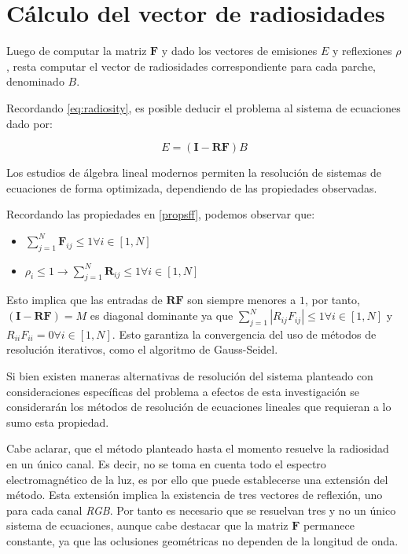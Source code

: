 \section{Cálculo del vector de radiosidades}

Luego de computar la matriz $\mathbf{F}$ y dado los vectores de emisiones $E$ y reflexiones $\rho$, resta computar el vector de radiosidades correspondiente para cada parche, denominado $B$.

Recordando \eqref{eq:radiosity}, es posible deducir el problema al sistema de ecuaciones dado por:

\begin{equation}
	E = (\mathbf{I} - \mathbf{RF})B
\end{equation}

Los estudios de álgebra lineal modernos permiten la resolución de sistemas de ecuaciones de forma optimizada, dependiendo de las propiedades observadas.

Recordando las propiedades en \ref{propsff}, podemos observar que:

\begin{itemize}
	\item $\sum_{j=1}^{N} \mathbf{F}_{ij} \leq 1 \forall{i \in [1,N]}$
	\item $\rho_{i} \leq 1 \rightarrow \sum_{j=1}^{N} \mathbf{R}_{ij} \leq 1 \forall{i \in [1,N]}$
\end{itemize}

Esto implica que las entradas de $\mathbf{RF}$ son siempre menores a $1$, por tanto, $(\mathbf{I} - \mathbf{RF}) = M$ es diagonal dominante ya que $\sum_{j=1}^{N}|R_{ij}F_{ij}| \le 1 \forall i \in [1, N]$ y $R_{ii}F_{ii} = 0  \forall i \in [1,N]$. Esto garantiza la convergencia del uso de métodos de resolución iterativos, como el algoritmo de Gauss-Seidel.

Si bien existen maneras alternativas de resolución del sistema planteado con consideraciones específicas del problema a efectos de esta investigación se considerarán los métodos de resolución de ecuaciones lineales que requieran a lo sumo esta propiedad.

Cabe aclarar, que el método planteado hasta el momento resuelve la radiosidad en un único canal. Es decir, no se toma en cuenta todo el espectro electromagnético de la luz, es por ello que puede establecerse una extensión del método. Esta extensión implica la existencia de tres vectores de reflexión, uno para cada canal \textit{RGB}. Por tanto es necesario que se resuelvan tres y no un único sistema de ecuaciones, aunque cabe destacar que la matriz $\mathbf{F}$ permanece constante, ya que las oclusiones geométricas no dependen de la longitud de onda.